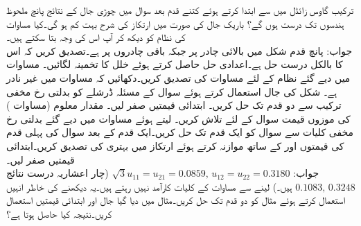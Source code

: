 \quad
ترکیب گاوس زائڈل میں  سے ابتدا کرتے ہوئے کتنے قدم بعد سوال  میں چوڑی جال کے نتائج پانچ ملحوظ ہندسوں تک درست ہوں گے؟ باریک جال کی صورت میں ارتکاز کی شرح بہت کم ہو گی۔کیا مساوات کی نظام کو دیکھ کر آپ اس کی وجہ بتا سکتے ہیں۔\\
جواب:\quad
پانچ قدم
شکل  میں بالائی چادر پر  جبکہ باقی چادروں پر  ہے۔تصدیق کریں کہ اس کا بالکل درست حل  ہے۔اعدادی حل حاصل کرتے ہوئے خلل کا تخمینہ لگائیں۔
\quad 
مساوات  میں دیے گئے نظام کے لئے مساوات  کی تصدیق کریں۔دکھائیں کہ مساوات  میں  غیر نادر ہے۔ 
\quad
شکل  کی جال استعمال کرتے ہوئے سوال  کے مسئلہ ڈرشلے  کو بدلتی رخ مخفی ترکیب سے دو قدم تک حل کریں۔  ابتدائی قیمتیں صفر لیں۔
\quad
مقدار معلوم  (مساوات ) کی موزوں قیمت  سوال  کے لئے تلاش کریں۔ لیتے ہوئے مساوات  میں دیے گئے بدلتی رخ مخفی کلیات سے سوال   کو ایک قدم تک حل کریں۔ایک قدم کے بعد سوال  کی پہلی قدم کی قیمتوں  اور  کے ساتھ موازنہ کرتے ہوئے ارتکاز میں بہتری کی تصدیق کریں۔ابتدائی قیمتیں صفر لیں۔\\
جواب:\quad
$\sqrt{3}u_{11}=u_{21}=0.0859,\, u_{12}=u_{22}=0.3180$
(چار اعشاریہ درست نتائج 
$0.1083,\,0.3248$
ہیں۔) 
\quad
{} لینے سے مساوات  کے کلیات کارآمد نہیں رہتے ہیں۔یہ دیکھنے کی خاطر انہیں استعمال کرتے ہوئے مثال  کو دو قدم تک حل کریں۔مثال میں دیا گیا جال اور ابتدائی قیمتیں استعمال کریں۔نتیجہ کیا حاصل ہوتا ہے؟

